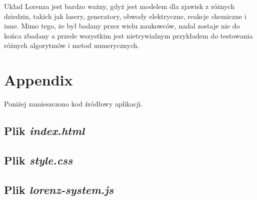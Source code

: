 \documentclass[12pt]{report}
\begin{document}
	\par Układ Lorenza jest bardzo ważny, gdyż jest modelem dla zjawisk z różnych dziedzin, takich jak lasery, generatory, obwody elektryczne, reakcje chemiczne i inne. Mimo tego, że był badany przez wielu naukowców, nadal zostaje nie do końca zbadany a przede wszystkim jest nietrywialnym przykładem do testowania różnych algorytmów i metod numerycznych. 

\chapter{Appendix}
	Poniżej zamieszczono kod źródłowy aplikacji.
	
	\section{Plik \textit{index.html}}
	\label{sec:html}
	
	
	\section{Plik \textit{style.css}}
	\label{sec:css}
	
	
	\section{Plik \textit{lorenz-system.js}}
	\label{sec:js}
	
	


\end{document}
